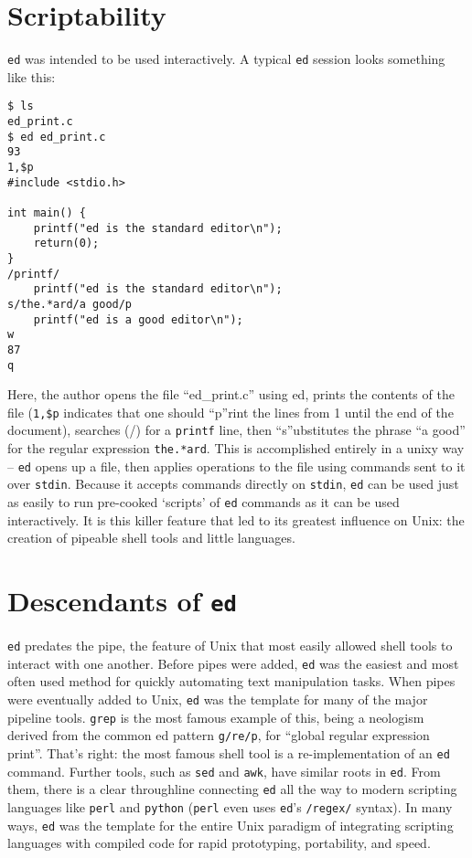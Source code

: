 \documentclass[12pt]{article}
\begin{document}
\section{Scriptability}

\lstinline{ed} was intended to be used interactively. A typical \lstinline{ed}
session looks something like this:

\begin{lstlisting}
$ ls
ed_print.c
$ ed ed_print.c
93
1,$p
#include <stdio.h>

int main() {
    printf("ed is the standard editor\n");
    return(0);
}
/printf/
    printf("ed is the standard editor\n");
s/the.*ard/a good/p
    printf("ed is a good editor\n");
w
87
q
\end{lstlisting}

Here, the author opens the file ``ed\_print.c'' using ed,
prints the contents of the file (\lstinline{1,$p} indicates
that one should ``p''rint the lines from 1 until the end of the document),
searches (/) for a \lstinline{printf} line,
then ``s''ubstitutes the phrase ``a good'' for the regular
expression \lstinline{the.*ard}.
This is accomplished entirely in a unixy way -- \lstinline{ed} opens
up a file, then applies operations to the file using commands
sent to it over \lstinline{stdin}. Because it accepts commands
directly on \lstinline{stdin}, \lstinline{ed} can be used just
as easily to run pre-cooked `scripts' of \lstinline{ed} commands
as it can be used interactively. It is this killer feature that
led to its greatest influence on Unix: the creation of pipeable
shell tools and little languages.

\section{Descendants of \lstinline{ed}}

\lstinline{ed} predates the pipe, the feature of Unix that most easily allowed shell
tools to interact with one another.
Before pipes were added, \lstinline{ed} was the easiest and most
often used method for quickly automating text manipulation tasks.
When pipes were eventually added to Unix, \lstinline{ed} was the template for many
of the major pipeline tools.
\lstinline{grep} is the most famous example of this, being a neologism derived
from the common ed pattern \lstinline{g/re/p}, for ``global regular expression print''.
That's right: the most famous shell tool is a re-implementation of an \lstinline{ed}
command. Further tools, such as \lstinline{sed} and \lstinline{awk}, have similar
roots in \lstinline{ed}. From them, there is a clear throughline connecting
\lstinline{ed} all the way to modern scripting languages like \lstinline{perl} and
\lstinline{python} (\lstinline{perl} even uses \lstinline{ed}'s \lstinline{/regex/} syntax).
In many ways, \lstinline{ed} was the template for the entire Unix paradigm of integrating scripting languages
with compiled code for rapid prototyping, portability, and speed.
\end{document}
